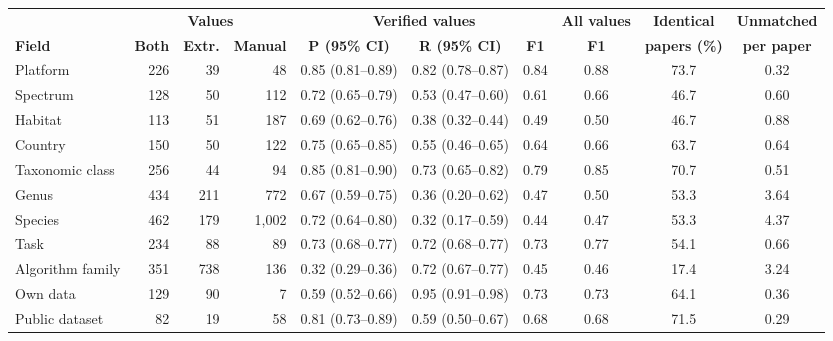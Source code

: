 \begin{tabular}{lrrrcccccc}
\toprule
 & \multicolumn{3}{c}{\textbf{Values}} & \multicolumn{3}{c}{\textbf{Verified values}} & \textbf{All values} & \textbf{Identical} & \textbf{Unmatched} \\
\cmidrule(lr){2-4}\cmidrule(lr){5-7}
\textbf{Field} & \textbf{Both} & \textbf{Extr.} & \textbf{Manual} & \textbf{P (95\% CI)} & \textbf{R (95\% CI)} & \textbf{F1} & \textbf{F1} & \textbf{papers (\%)} & \textbf{per paper} \\
\midrule
Platform & 226 & 39 & 48 & 0.85 (0.81--0.89) & 0.82 (0.78--0.87) & 0.84 & 0.88 & 73.7 & 0.32 \\
Spectrum & 128 & 50 & 112 & 0.72 (0.65--0.79) & 0.53 (0.47--0.60) & 0.61 & 0.66 & 46.7 & 0.60 \\
Habitat & 113 & 51 & 187 & 0.69 (0.62--0.76) & 0.38 (0.32--0.44) & 0.49 & 0.50 & 46.7 & 0.88 \\
Country & 150 & 50 & 122 & 0.75 (0.65--0.85) & 0.55 (0.46--0.65) & 0.64 & 0.66 & 63.7 & 0.64 \\
Taxonomic class & 256 & 44 & 94 & 0.85 (0.81--0.90) & 0.73 (0.65--0.82) & 0.79 & 0.85 & 70.7 & 0.51 \\
Genus & 434 & 211 & 772 & 0.67 (0.59--0.75) & 0.36 (0.20--0.62) & 0.47 & 0.50 & 53.3 & 3.64 \\
Species & 462 & 179 & 1,002 & 0.72 (0.64--0.80) & 0.32 (0.17--0.59) & 0.44 & 0.47 & 53.3 & 4.37 \\
Task & 234 & 88 & 89 & 0.73 (0.68--0.77) & 0.72 (0.68--0.77) & 0.73 & 0.77 & 54.1 & 0.66 \\
Algorithm family & 351 & 738 & 136 & 0.32 (0.29--0.36) & 0.72 (0.67--0.77) & 0.45 & 0.46 & 17.4 & 3.24 \\
Own data & 129 & 90 & 7 & 0.59 (0.52--0.66) & 0.95 (0.91--0.98) & 0.73 & 0.73 & 64.1 & 0.36 \\
Public dataset & 82 & 19 & 58 & 0.81 (0.73--0.89) & 0.59 (0.50--0.67) & 0.68 & 0.68 & 71.5 & 0.29 \\
\bottomrule
\end{tabular}
